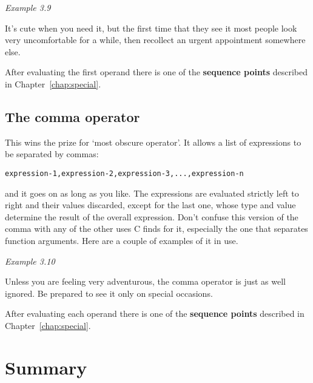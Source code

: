     \begin{center}\textit{Example 3.9}\end{center}


   It's cute when you need it, but the first time that they see it most
    people look very uncomfortable for a while, then recollect an urgent
    appointment somewhere else.


   After evaluating the first operand there is one of the \textbf{sequence
    points} described in Chapter~\ref{chap:special}.



  

  \subsection{The comma operator}
   

   This wins the prize for `most obscure operator'. It allows a list
    of expressions to be separated by commas:


   \begin{Verbatim}
expression-1,expression-2,expression-3,...,expression-n
\end{Verbatim}

   and it goes on as long as you like. The expressions are
    evaluated strictly left to right and their values discarded, except for
    the last one, whose type and value determine the result of the overall
    expression. Don't confuse this version of the comma with any of the other
    uses C finds for it, especially the one that separates function arguments.
    Here are a couple of examples of it in use.


   \begin{center}\textit{Example 3.10}\end{center}


   Unless you are feeling very adventurous, the comma operator is just as
    well ignored. Be prepared to see it only on special occasions.


   After evaluating each operand there is one of the \textbf{sequence
    points} described in Chapter~\ref{chap:special}.


  

 
        \section{Summary}
        


